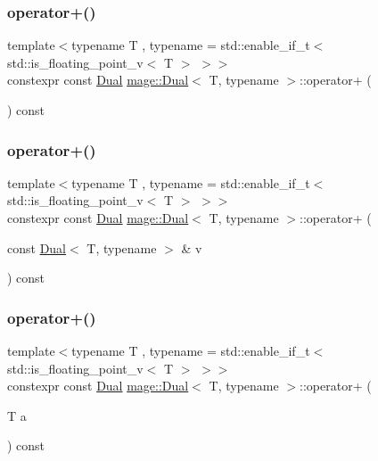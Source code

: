 \subsubsection{\texorpdfstring{operator+()}{operator+()}\hspace{0.1cm}{\footnotesize\ttfamily [1/3]}}
{\footnotesize\ttfamily template$<$typename T , typename  = std\+::enable\+\_\+if\+\_\+t$<$ std\+::is\+\_\+floating\+\_\+point\+\_\+v$<$ T $>$ $>$$>$ \\
constexpr const \mbox{\hyperlink{structmage_1_1_dual}{Dual}} \mbox{\hyperlink{structmage_1_1_dual}{mage\+::\+Dual}}$<$ T, typename $>$\+::operator+ (\begin{DoxyParamCaption}{ }\end{DoxyParamCaption}) const\hspace{0.3cm}{\ttfamily [noexcept]}}

\mbox{\label{structmage_1_1_dual_ad1d4ab5eeb0b2a38b8f6871741dd4b79}} 
\subsubsection{\texorpdfstring{operator+()}{operator+()}\hspace{0.1cm}{\footnotesize\ttfamily [2/3]}}
{\footnotesize\ttfamily template$<$typename T , typename  = std\+::enable\+\_\+if\+\_\+t$<$ std\+::is\+\_\+floating\+\_\+point\+\_\+v$<$ T $>$ $>$$>$ \\
constexpr const \mbox{\hyperlink{structmage_1_1_dual}{Dual}} \mbox{\hyperlink{structmage_1_1_dual}{mage\+::\+Dual}}$<$ T, typename $>$\+::operator+ (\begin{DoxyParamCaption}\item[{const \mbox{\hyperlink{structmage_1_1_dual}{Dual}}$<$ T, typename $>$ \&}]{v }\end{DoxyParamCaption}) const\hspace{0.3cm}{\ttfamily [noexcept]}}

\mbox{\label{structmage_1_1_dual_a954e200aa92be289de2f95e117c3f74d}} 
\subsubsection{\texorpdfstring{operator+()}{operator+()}\hspace{0.1cm}{\footnotesize\ttfamily [3/3]}}
{\footnotesize\ttfamily template$<$typename T , typename  = std\+::enable\+\_\+if\+\_\+t$<$ std\+::is\+\_\+floating\+\_\+point\+\_\+v$<$ T $>$ $>$$>$ \\
constexpr const \mbox{\hyperlink{structmage_1_1_dual}{Dual}} \mbox{\hyperlink{structmage_1_1_dual}{mage\+::\+Dual}}$<$ T, typename $>$\+::operator+ (\begin{DoxyParamCaption}\item[{T}]{a }\end{DoxyParamCaption}) const\hspace{0.3cm}{\ttfamily [noexcept]}}

